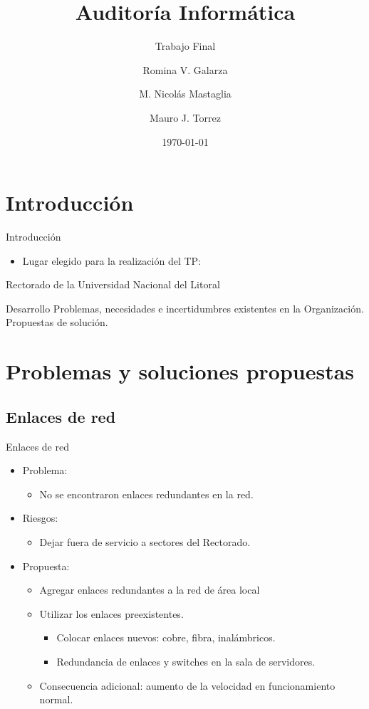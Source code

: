 \documentclass[spanish]{beamer}
\title{Auditoría Informática}
\subtitle{Trabajo Final}
\author{Romina V. Galarza \and M. Nicolás Mastaglia \and Mauro J. Torrez}
\date{\today}
\begin{document}

\section{Introducción}

\begin{frame}{Introducción}
    \begin{itemize}
    \item Lugar elegido para la realización del TP:
    \end{itemize}
Rectorado de la Universidad Nacional del Litoral
\end{frame}


\begin{frame}{Desarrollo}
  \large Problemas, necesidades e incertidumbres existentes en la
  Organización. Propuestas de solución.
\end{frame}


\section[Outline]{Problemas y soluciones propuestas}

\subsection[Outline]{Enlaces de red}

\begin{frame}{Enlaces de red}
  \begin{itemize}
  \item Problema:
    \begin{itemize}
    \item No se encontraron enlaces redundantes en la red.
    \end{itemize}
  \item Riesgos:
    \begin{itemize}
    \item Dejar fuera de servicio a sectores del Rectorado.
    \end{itemize}
  \item Propuesta:
    \begin{itemize}
    \item Agregar enlaces redundantes a la red de área local
        \item Utilizar los enlaces preexistentes.
          \begin{itemize}
          \item Colocar enlaces nuevos: cobre, fibra, inalámbricos.
          \item Redundancia de enlaces y switches en la sala de
            servidores.
          \end{itemize}
        \item Consecuencia adicional: aumento de la velocidad en
          funcionamiento normal.
    \end{itemize}
  \end{itemize}
\end{frame}
\end{document}
